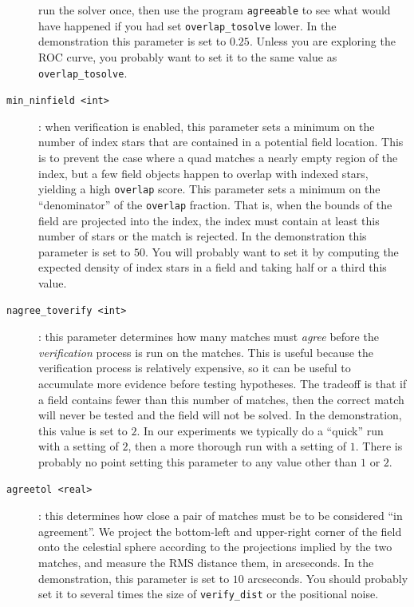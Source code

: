 \documentclass[12pt,letterpaper,titlepage]{article}
\newcommand{\code}[1]{\texttt{#1}}
\begin{document}
\begin{description}
  run the solver once, then use the program \code{agreeable} to see what
  would have happened if you had set \code{overlap\_tosolve} lower.
  In the demonstration this parameter is set to $0.25$.  Unless you are
  exploring the ROC curve, you probably want to set it to the same value as
  \code{overlap\_tosolve}.
\item[\code{min\_ninfield <int>}]: when verification is enabled, this parameter
  sets a minimum on the number of index stars that are contained in a
  potential field location.  This is to prevent the case where a quad matches
  a nearly empty region of the index, but a few field objects happen to overlap
  with indexed stars, yielding a high \code{overlap} score.  This parameter sets
  a minimum on the ``denominator'' of the \code{overlap} fraction.  That is,
  when the bounds of the field are projected into the index, the index must
  contain at least this number of stars or the match is rejected.  In the
  demonstration this parameter is set to $50$.  You will probably want to set
  it by computing the expected density of index stars in a field and taking
  half or a third this value.
\item[\code{nagree\_toverify <int>}]: this parameter determines how many
  matches must \emph{agree} before the \emph{verification} process is run on
  the matches.  This is useful because the verification process is relatively
  expensive, so it can be useful to accumulate more evidence before testing
  hypotheses.  The tradeoff is that if a field contains fewer than this number
  of matches, then the correct match will never be tested and the field will
  not be solved.  In the demonstration, this value is set to $2$.  In our
  experiments we typically do a ``quick'' run with a setting of $2$, then a
  more thorough run with a setting of $1$.  There is probably no point setting
  this parameter to any value other than $1$ or $2$.
\item[\code{agreetol <real>}]: this determines how close a pair of matches
  must be to be considered ``in agreement''.
  We project the bottom-left and upper-right corner of the field 
  onto the celestial sphere according
  to the projections implied by the two matches,
  and measure the RMS distance them, in arcseconds.
  In the demonstration, this parameter is set to $10$ arcseconds.  You
  should probably set it to several times the size of \code{verify\_dist}
  or the positional noise.
\end{description}
\end{document}
